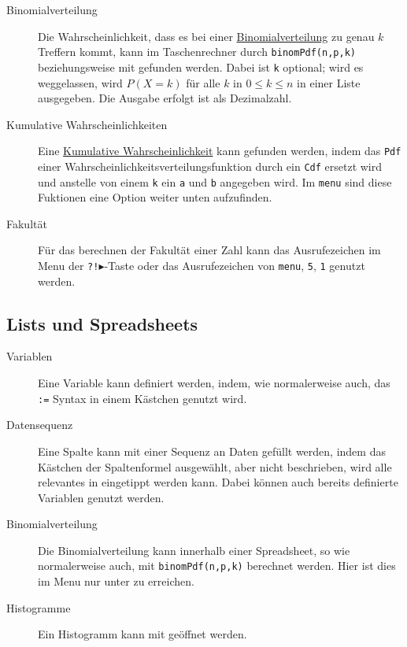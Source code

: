 \documentclass{article}
\begin{document}
\begin{description}
 \item[Binomialverteilung] Die Wahrscheinlichkeit, dass es bei einer \hyperref[Binomialverteilungen]{Binomialverteilung} zu genau $k$ Treffern kommt, kann im Taschenrechner durch \texttt{binomPdf(n,p,k)} beziehungsweise mit  \arrow {} \arrow {} \arrow {} gefunden werden. Dabei ist \texttt{k} optional; wird es weggelassen, wird $P(X=k)$ für alle $k$ in $0 \leq k \leq n$ in einer Liste ausgegeben. Die Ausgabe erfolgt ist als Dezimalzahl.
 \item[Kumulative Wahrscheinlichkeiten] Eine \hyperref[Kumulative Wahrscheinlichkeiten]{Kumulative Wahrscheinlichkeit} kann gefunden werden, indem das \texttt{Pdf} einer Wahrscheinlichkeitsverteilungsfunktion durch ein \texttt{Cdf} ersetzt wird und anstelle von einem \texttt{k} ein \texttt{a} und \texttt{b} angegeben wird. Im \texttt{menu} sind diese Fuktionen eine Option weiter unten aufzufinden.
 \item[Fakultät] Für das berechnen der Fakultät einer Zahl kann das Ausrufezeichen im Menu der \texttt{?!$\blacktriangleright$}-Taste oder das Ausrufezeichen von \texttt{menu}, \texttt{5}, \texttt{1} genutzt werden.  
\end{description} 
 
\subsection{Lists und Spreadsheets}
\begin{description}
 \item[Variablen] Eine Variable kann definiert werden, indem, wie normalerweise auch, das \texttt{:=} Syntax in einem Kästchen genutzt wird. 
 \item[Datensequenz] Eine Spalte kann mit einer Sequenz an Daten gefüllt werden, indem das Kästchen der Spaltenformel ausgewählt, aber nicht beschrieben, wird alle relevantes in  \arrow {} \arrow {} eingetippt werden kann. Dabei können auch bereits definierte Variablen genutzt werden.
 \item[Binomialverteilung] Die Binomialverteilung kann innerhalb einer Spreadsheet, so wie normalerweise auch, mit \texttt{binomPdf(n,p,k)} berechnet werden. Hier ist dies im Menu nur unter  \arrow {} \arrow {} \arrow {} zu erreichen.
 \item[Histogramme] Ein Histogramm kann mit  \arrow {} \arrow {} geöffnet werden.
\end{description}  
\end{document}
